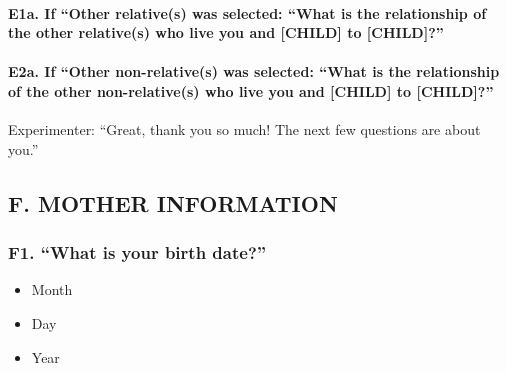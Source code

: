 \documentclass[
  12pt,
]{book}
\providecommand{\tightlist}{%
  \setlength{\itemsep}{0pt}\setlength{\parskip}{0pt}}
\begin{document}
\hypertarget{e1a.-if-other-relatives-was-selected-what-is-the-relationship-of-the-other-relatives-who-live-you-and-child-to-child}{%
\paragraph*{E1a. If ``Other relative(s) was selected: ``What is the relationship of the other relative(s) who live you and {[}CHILD{]} to {[}CHILD{]}?''}\label{e1a.-if-other-relatives-was-selected-what-is-the-relationship-of-the-other-relatives-who-live-you-and-child-to-child}}

\hypertarget{e2a.-if-other-non-relatives-was-selected-what-is-the-relationship-of-the-other-non-relatives-who-live-you-and-child-to-child}{%
\paragraph*{E2a. If ``Other non-relative(s) was selected: ``What is the relationship of the other non-relative(s) who live you and {[}CHILD{]} to {[}CHILD{]}?''}\label{e2a.-if-other-non-relatives-was-selected-what-is-the-relationship-of-the-other-non-relatives-who-live-you-and-child-to-child}}

Experimenter: ``Great, thank you so much! The next few questions are about you.''

\hypertarget{f.-mother-information}{%
\subsection*{F. MOTHER INFORMATION}\label{f.-mother-information}}

\hypertarget{f1.-what-is-your-birth-date}{%
\subsubsection*{F1. ``What is your birth date?''}\label{f1.-what-is-your-birth-date}}

\begin{itemize}
\tightlist
\item
  Month
\item
  Day
\item
  Year
\end{itemize}
\end{document}
